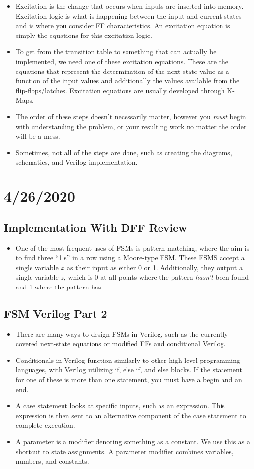 \documentclass[10pt,a4paper]{article}
\begin{document}
\begin{itemize}
\item Excitation is the change that occurs when inputs are inserted into memory. Excitation logic is what is happening between the input and current states and is where you consider FF characteristics. An excitation equation is simply the equations for this excitation logic. 
\item To get from the transition table to something that can actually be implemented, we need one of these excitation equations. These are the equations that represent the determination of the next state value as a function of the input values and additionally the values available from the flip-flops/latches. Excitation equations are usually developed through K-Maps. 
\item The order of these steps doesn't necessarily matter, however you \textit{must} begin with understanding the problem, or your resulting work no matter the order will be a mess. 
\item Sometimes, not all of the steps are done, such as creating the diagrams, schematics, and Verilog implementation.
\end{itemize}
\pagebreak
\section{4/26/2020}
\subsection{Implementation With DFF Review}
\begin{itemize}
\item One of the most frequent uses of FSMs is pattern matching, where the aim is to find three ``1's'' in a row using a Moore-type FSM. These FSMS accept a single variable $x$ as their input as either 0 or 1. Additionally, they output a single variable $z$, which is 0 at all points where the pattern \textit{hasn't} been found and 1 where the pattern has. 
\end{itemize}
\subsection{FSM Verilog Part 2}
\begin{itemize}
\item There are many ways to design FSMs in Verilog, such as the currently covered next-state equations or modified FFs and conditional Verilog.
\item Conditionals in Verilog function similarly to other high-level programming languages, with Verilog utilizing if, else if, and else blocks. If the statement for one of these is more than one statement, you must have a begin and an end.
\item A case statement looks at specific inputs, such as an expression. This expression is then sent to an alternative component of the case statement to complete execution. 
\item A parameter is a modifier denoting something as a constant. We use this as a shortcut to state assignments. A parameter modifier combines variables, numbers, and constants.
\end{itemize}
\end{document}
